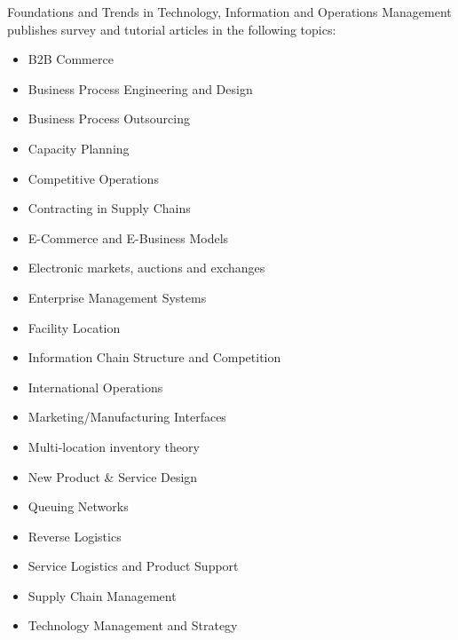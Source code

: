 


\journalaimsandscope
 {%
  Foundations and Trends\textsuperscript{\textregistered} in
Technology, Information and Operations Management publishes
 survey and tutorial articles in the following topics:
 \begin{multicols}{2}\raggedcolumns
 \begin{itemize}
\item{B2B Commerce}
\item{Business Process Engineering and Design}
\item{Business Process Outsourcing}
\item{Capacity Planning}
\item{Competitive Operations}
\item{Contracting in Supply Chains}
\item{E-Commerce and E-Business Models}
\item{Electronic markets, auctions and exchanges}
\item{Enterprise Management Systems}
\item{Facility Location}
\item{Information Chain Structure and Competition}
\item{International Operations}
\item{Marketing/Manufacturing Interfaces}
\item{Multi-location inventory theory}
\item{New Product \& Service Design}
\item{Queuing Networks}
\item{Reverse Logistics}
\item{Service Logistics and Product Support}
\item{Supply Chain Management}
\item{Technology Management and Strategy}

\end{itemize}
\end{multicols}}
